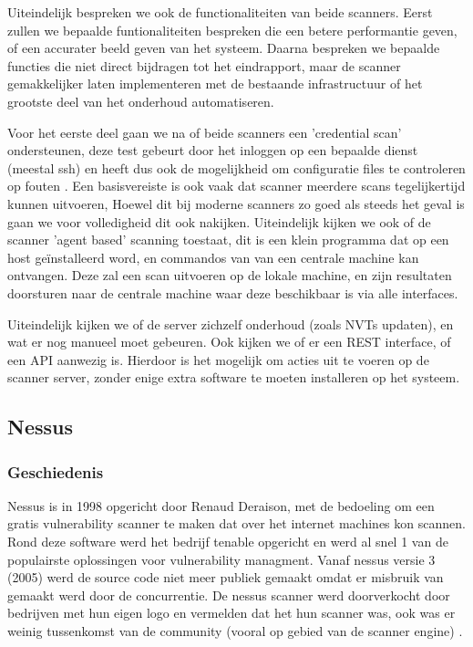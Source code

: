 Uiteindelijk bespreken we ook de functionaliteiten van beide scanners. Eerst zullen we bepaalde funtionaliteiten bespreken die een betere performantie geven, of een accurater beeld geven van het systeem. Daarna bespreken we bepaalde functies die niet direct bijdragen tot het eindrapport, maar de scanner gemakkelijker laten implementeren met de bestaande infrastructuur of het grootste deel van het onderhoud automatiseren. 

Voor het eerste deel gaan we na of beide scanners een 'credential scan' ondersteunen, deze test gebeurt door het inloggen op een bepaalde dienst (meestal ssh) en heeft dus ook de mogelijkheid om configuratie files te controleren op fouten \textcite{Digitalbond}. Een basisvereiste is ook vaak dat scanner meerdere scans tegelijkertijd kunnen uitvoeren, Hoewel dit bij moderne scanners zo goed als steeds het geval is gaan we voor volledigheid dit ook nakijken. Uiteindelijk kijken we ook of de scanner 'agent based' scanning toestaat, dit is een klein programma dat op een host geïnstalleerd word, en commandos van van een centrale machine kan ontvangen. Deze zal een scan uitvoeren op de lokale machine, en zijn resultaten doorsturen naar de centrale machine waar deze beschikbaar is via alle interfaces.

Uiteindelijk kijken we of  de server zichzelf onderhoud (zoals NVTs updaten), en wat er nog manueel moet gebeuren. Ook kijken we of er een REST interface, of een API aanwezig is. Hierdoor is het mogelijk om acties uit te voeren op de scanner server, zonder enige extra software te moeten installeren op het systeem.

\subsection{Nessus}


\subsubsection{Geschiedenis}
Nessus is in 1998 opgericht door Renaud Deraison, met de bedoeling om een gratis vulnerability scanner te maken dat over het internet machines kon scannen. Rond deze software werd het bedrijf tenable opgericht en werd al snel 1 van de populairste oplossingen voor vulnerability managment. Vanaf nessus versie 3 (2005) werd de source code niet meer publiek gemaakt omdat er misbruik van gemaakt werd door de concurrentie. De nessus scanner werd doorverkocht door bedrijven met hun eigen logo en vermelden dat het hun scanner was, ook was er weinig tussenkomst van de community (vooral op gebied van de scanner engine) \textcite{Cnet}.

